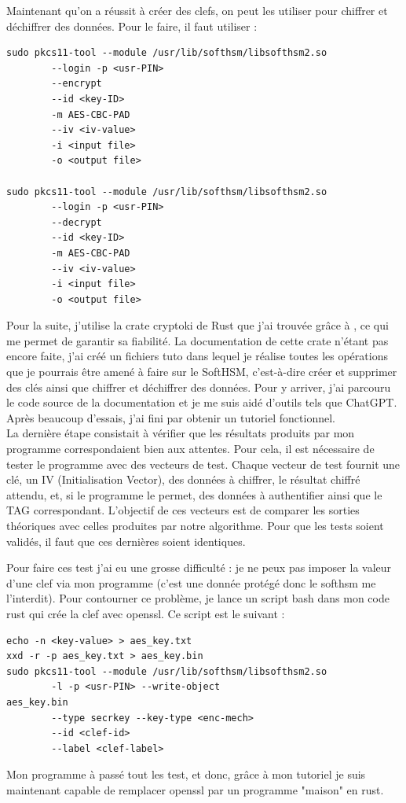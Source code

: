 \documentclass[a4paper, 12pt]{article}
\begin{document}
Maintenant qu'on a réussit à créer des clefs, on peut les utiliser pour chiffrer et déchiffrer des données. Pour le faire, il faut utiliser :
\begin{verbatim}
sudo pkcs11-tool --module /usr/lib/softhsm/libsofthsm2.so 
		--login -p <usr-PIN> 
		--encrypt 
		--id <key-ID> 
		-m AES-CBC-PAD 
		--iv <iv-value> 
		-i <input file> 
		-o <output file>

sudo pkcs11-tool --module /usr/lib/softhsm/libsofthsm2.so 
		--login -p <usr-PIN> 
		--decrypt 
		--id <key-ID> 
		-m AES-CBC-PAD 
		--iv <iv-value> 
		-i <input file> 
		-o <output file>
\end{verbatim}

Pour la suite, j'utilise la crate cryptoki de Rust que j'ai trouvée grâce à \cite{bddrustcrypto}, ce qui me permet de garantir sa fiabilité.
La documentation de cette crate n'étant pas encore faite, j'ai créé un fichiers tuto dans lequel je réalise toutes les opérations que je pourrais être amené à faire sur le SoftHSM, c'est-à-dire créer et supprimer des clés ainsi que chiffrer et déchiffrer des données. Pour y arriver, j'ai parcouru le code source de la documentation et je me suis aidé d'outils tels que ChatGPT. Après beaucoup d'essais, j'ai fini par obtenir un tutoriel fonctionnel.\\

La dernière étape consistait à vérifier que les résultats produits par mon programme correspondaient bien aux attentes. Pour cela, il est nécessaire de tester le programme avec des vecteurs de test. Chaque vecteur de test fournit une clé, un IV (Initialisation Vector), des données à chiffrer, le résultat chiffré attendu, et, si le programme le permet, des données à authentifier ainsi que le TAG correspondant. L'objectif de ces vecteurs est de comparer les sorties théoriques avec celles produites par notre algorithme. Pour que les tests soient validés, il faut que ces dernières soient identiques.

Pour faire ces test j'ai eu une grosse difficulté : je ne peux pas imposer la valeur d'une clef via mon programme (c'est une donnée protégé donc le softhsm me l'interdit). Pour contourner ce problème, je lance un script bash dans mon code rust qui crée la clef avec openssl. Ce script est le suivant : 
\begin{verbatim}
echo -n <key-value> > aes_key.txt
xxd -r -p aes_key.txt > aes_key.bin
sudo pkcs11-tool --module /usr/lib/softhsm/libsofthsm2.so 
		-l -p <usr-PIN> --write-object
aes_key.bin 
		--type secrkey --key-type <enc-mech> 
		--id <clef-id> 
		--label <clef-label>
\end{verbatim}
Mon programme à passé tout les test, et donc, grâce à mon tutoriel je suis maintenant capable de remplacer openssl par un programme "maison" en rust.
\end{document}
